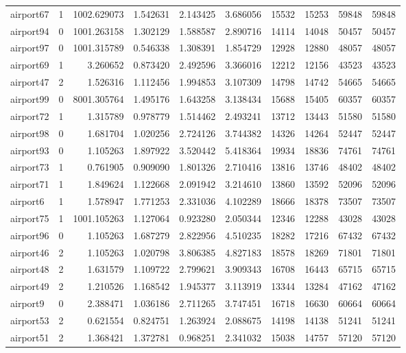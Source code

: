 \begin{longtable}{|l|r|r|r|r|r|r|r|r|r|}
airport67 & 1 & 1002.629073 & 1.542631 & 2.143425 & 3.686056 & 15532 & 15253 & 59848 & 59848 \\
airport94 & 0 & 1001.263158 & 1.302129 & 1.588587 & 2.890716 & 14114 & 14048 & 50457 & 50457 \\
airport97 & 0 & 1001.315789 & 0.546338 & 1.308391 & 1.854729 & 12928 & 12880 & 48057 & 48057 \\
airport69 & 1 & 3.260652 & 0.873420 & 2.492596 & 3.366016 & 12212 & 12156 & 43523 & 43523 \\
airport47 & 2 & 1.526316 & 1.112456 & 1.994853 & 3.107309 & 14798 & 14742 & 54665 & 54665 \\
airport99 & 0 & 8001.305764 & 1.495176 & 1.643258 & 3.138434 & 15688 & 15405 & 60357 & 60357 \\
airport72 & 1 & 1.315789 & 0.978779 & 1.514462 & 2.493241 & 13712 & 13443 & 51580 & 51580 \\
airport98 & 0 & 1.681704 & 1.020256 & 2.724126 & 3.744382 & 14326 & 14264 & 52447 & 52447 \\
airport93 & 0 & 1.105263 & 1.897922 & 3.520442 & 5.418364 & 19934 & 18836 & 74761 & 74761 \\
airport73 & 1 & 0.761905 & 0.909090 & 1.801326 & 2.710416 & 13816 & 13746 & 48402 & 48402 \\
airport71 & 1 & 1.849624 & 1.122668 & 2.091942 & 3.214610 & 13860 & 13592 & 52096 & 52096 \\
airport6 & 1 & 1.578947 & 1.771253 & 2.331036 & 4.102289 & 18666 & 18378 & 73507 & 73507 \\
airport75 & 1 & 1001.105263 & 1.127064 & 0.923280 & 2.050344 & 12346 & 12288 & 43028 & 43028 \\
airport96 & 0 & 1.105263 & 1.687279 & 2.822956 & 4.510235 & 18282 & 17216 & 67432 & 67432 \\
airport46 & 2 & 1.105263 & 1.020798 & 3.806385 & 4.827183 & 18578 & 18269 & 71801 & 71801 \\
airport48 & 2 & 1.631579 & 1.109722 & 2.799621 & 3.909343 & 16708 & 16443 & 65715 & 65715 \\
airport49 & 2 & 1.210526 & 1.168542 & 1.945377 & 3.113919 & 13344 & 13284 & 47162 & 47162 \\
airport9 & 0 & 2.388471 & 1.036186 & 2.711265 & 3.747451 & 16718 & 16630 & 60664 & 60664 \\
airport53 & 2 & 0.621554 & 0.824751 & 1.263924 & 2.088675 & 14198 & 14138 & 51241 & 51241 \\
airport51 & 2 & 1.368421 & 1.372781 & 0.968251 & 2.341032 & 15038 & 14757 & 57120 & 57120 \\

\end{longtable}
